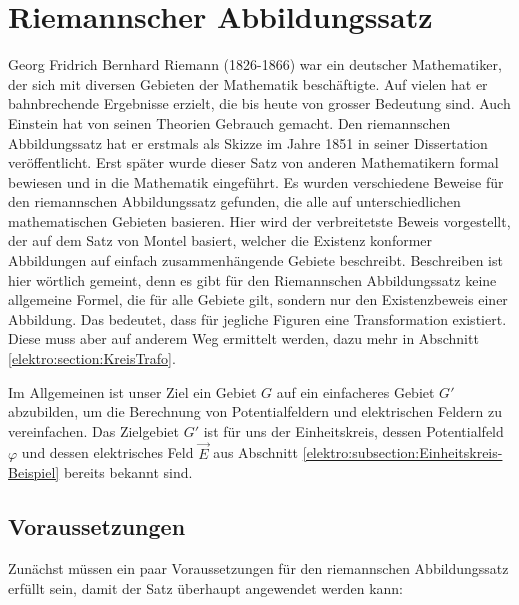 %
%
%
%


\section{Riemannscher Abbildungssatz
\label{elektro:section:RiemannSatz}}

Georg Fridrich Bernhard Riemann (1826-1866) \cite{elektro:riemann} war ein deutscher Mathematiker, der sich mit diversen Gebieten der Mathematik beschäftigte.
Auf vielen hat er bahnbrechende Ergebnisse erzielt, die bis heute von grosser Bedeutung sind.
Auch Einstein hat von seinen Theorien Gebrauch gemacht.
Den riemannschen Abbildungssatz hat er erstmals als Skizze im Jahre 1851 in seiner Dissertation veröffentlicht. 
Erst später wurde dieser Satz von anderen Mathematikern formal bewiesen und in die Mathematik eingeführt. 
Es wurden verschiedene Beweise für den riemannschen Abbildungssatz gefunden, die alle auf unterschiedlichen mathematischen Gebieten basieren.
Hier wird der verbreitetste Beweis vorgestellt, der auf dem Satz von Montel basiert, welcher die Existenz konformer Abbildungen auf einfach zusammenhängende Gebiete beschreibt.
Beschreiben ist hier wörtlich gemeint, denn es gibt für den Riemannschen Abbildungssatz keine allgemeine Formel, die für alle Gebiete gilt, sondern nur den Existenzbeweis einer Abbildung.
Das bedeutet, dass für jegliche Figuren eine Transformation existiert.
Diese muss aber auf anderem Weg ermittelt werden, dazu mehr in Abschnitt \ref{elektro:section:KreisTrafo}.

Im Allgemeinen ist unser Ziel ein Gebiet $G$ auf ein einfacheres Gebiet $G'$ abzubilden, um die Berechnung von Potentialfeldern und elektrischen Feldern zu vereinfachen. 
Das Zielgebiet $G'$ ist für uns der Einheitskreis, dessen Potentialfeld $\varphi$ und dessen elektrisches Feld $\vec{E}$ aus Abschnitt \ref{elektro:subsection:Einheitskreis-Beispiel} bereits bekannt sind.

\subsection{Voraussetzungen
\label{elektro:subsection:RiemannVoraussetzungen}}
Zunächst müssen ein paar Voraussetzungen für den riemannschen Abbildungssatz erfüllt sein, damit der Satz überhaupt angewendet werden kann:

